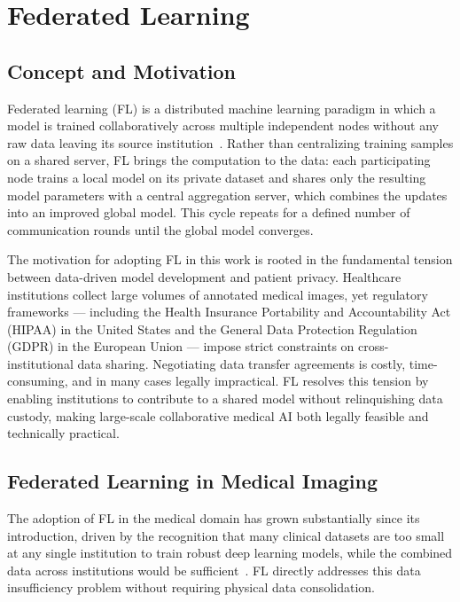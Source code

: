 \section{Federated Learning}
\subsection{Concept and Motivation}
\label{subsec:fl_concept}
 
Federated learning (FL) is a distributed machine learning paradigm in which
a model is trained collaboratively across multiple independent nodes without
any raw data leaving its source institution~\cite{mcmahan2017}. Rather than
centralizing training samples on a shared server, FL brings the computation
to the data: each participating node trains a local model on its private
dataset and shares only the resulting model parameters with a central
aggregation server, which combines the updates into an improved global model.
This cycle repeats for a defined number of communication rounds until the
global model converges.
 
The motivation for adopting FL in this work is rooted in the fundamental
tension between data-driven model development and patient privacy. Healthcare
institutions collect large volumes of annotated medical images, yet regulatory
frameworks — including the Health Insurance Portability and Accountability Act
(HIPAA) in the United States and the General Data Protection Regulation (GDPR)
in the European Union — impose strict constraints on cross-institutional data
sharing. Negotiating data transfer agreements is costly, time-consuming, and
in many cases legally impractical. FL resolves this tension by enabling
institutions to contribute to a shared model without relinquishing data
custody, making large-scale collaborative medical AI both legally feasible
and technically practical.
 
\subsection{Federated Learning in Medical Imaging}
\label{subsec:fl_medical}
 
The adoption of FL in the medical domain has grown substantially since its
introduction, driven by the recognition that many clinical datasets are too
small at any single institution to train robust deep learning models, while
the combined data across institutions would be sufficient~\cite{sheller2019}.
FL directly addresses this data insufficiency problem without requiring
physical data consolidation.
 
